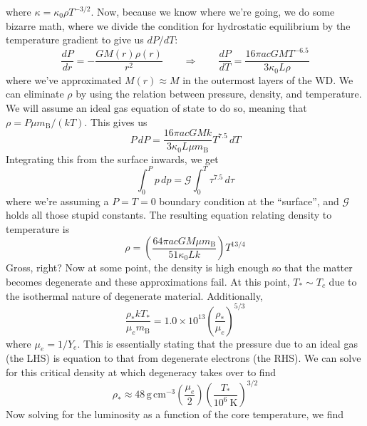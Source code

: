 \documentclass[10pt]{article}
\numberwithin{equation}{section}
\begin{document}
	where $\kappa = \kappa_0 \rho T^{-3/2}$. Now, because we know where we're going, we do some bizarre math, where we divide the condition for hydrostatic equilibrium by the temperature gradient to give us $dP/dT$:
	\begin{equation}
		\label{eq:cooing:5} \frac{dP}{dr} = -\frac{GM(r)\rho(r)}{r^2} \qquad \Rightarrow \qquad \frac{dP}{dT} = \frac{16\pi ac GM T^{-6.5}}{3\kappa_0 L \rho}
	\end{equation}
	where we've approximated $M(r)\approx M$ in the outermost layers of the WD. We can eliminate $\rho$ by using the relation between pressure, density, and temperature. We will assume an ideal gas equation of state to do so, meaning that $\rho = P\mu m_{\mathrm{B}}/(kT)$. This gives us
	\begin{equation}
		\label{eq:cooling:6} P\,dP = \frac{16\pi ac G M k}{3 \kappa_0 L \mu m_{\mathrm{B}}} T^{7.5}\,dT
	\end{equation}
	Integrating this from the surface inwards, we get
	\begin{equation}
		\label{eq:cooling:7} \int_0^P p\,dp = \mathcal{G} \int_0^T \tau^{7.5}\,d\tau
	\end{equation}
	where we're assuming a $P=T=0$ boundary condition at the ``surface'', and $\mathcal{G}$ holds all those stupid constants. The resulting equation relating density to temperature is
	\begin{equation}
		\label{eq:cooling:8} \boxed{\rho = \left(\frac{64 \pi a c G M \mu m_{\mathrm{B}}}{51 \kappa_0 L k}\right) T^{13/4}}
	\end{equation}
	Gross, right? Now at some point, the density is high enough so that the matter becomes degenerate and these approximations fail. At this point, $T_{*}\sim T_c$ due to the isothermal nature of degenerate material. Additionally,
	\begin{equation}
		\label{eq:cooling:9} \frac{\rho_* k T_*}{\mu_e m_{\mathrm{B}}} = 1.0\times 10^{13} \left(\frac{\rho_*}{\mu_e}\right)^{5/3}
	\end{equation}
	where $\mu_e = 1/Y_e$. This is essentially stating that the pressure due to an ideal gas (the LHS) is equation to that from degenerate electrons (the RHS). We can solve for this critical density at which degeneracy takes over to find
	\begin{equation}
		\label{eq:cooling:10} \rho_* \approx 48\,\mathrm{g\,cm^{-3}}\left(\frac{\mu_e}{2}\right)\left(\frac{T_*}{10^6\ \mathrm{K}}\right)^{3/2}
	\end{equation}
	Now solving for the luminosity  as a function of the core temperature, we find
\end{document}
